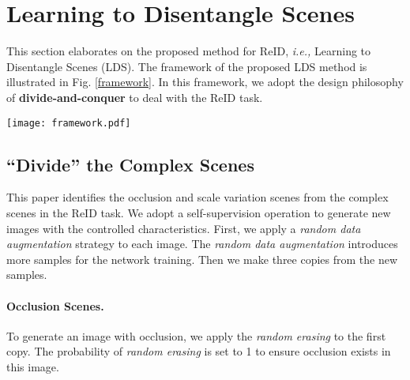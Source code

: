 \documentclass[a4paper]{cas-dc}
\begin{document}
\section{Learning to Disentangle Scenes} \label{method}
This section elaborates on the proposed method for ReID, \textit{i.e.,} Learning to Disentangle Scenes (LDS). The framework of the proposed LDS method is illustrated in Fig. \ref{framework}. In this framework, we adopt the design philosophy of \textbf{divide-and-conquer} to deal with the ReID task.

\begin{figure*}
	\centering
	\texttt{[image: framework.pdf]}
	\caption{The framework of the proposed LDS method. We propose a divide-and-conquer strategy to deal with the ReID task. This framework contains two parts, ``divide'' and ``conquer'' parts. They are used to ``divide'' the complex scenes and ``conquer'' the specific scene. In the ``conquer'' part, we use mutual learning to promote each branch.}
	\label{framework}
\end{figure*}

\subsection{``Divide'' the Complex Scenes} \label{scenesimulation}
This paper identifies the occlusion and scale variation scenes from the complex scenes in the ReID task. We adopt a self-supervision operation to generate new images with the controlled characteristics. First, we apply a \textit{random data augmentation} strategy to each image. The \textit{random data augmentation} introduces more samples for the network training. Then we make three copies from the new samples.

\paragraph{Occlusion Scenes.} To generate an image with occlusion, we apply the \textit{random erasing} to the first copy. The probability of \textit{random erasing} is set to 1 to ensure occlusion exists in this image.
\end{document}
